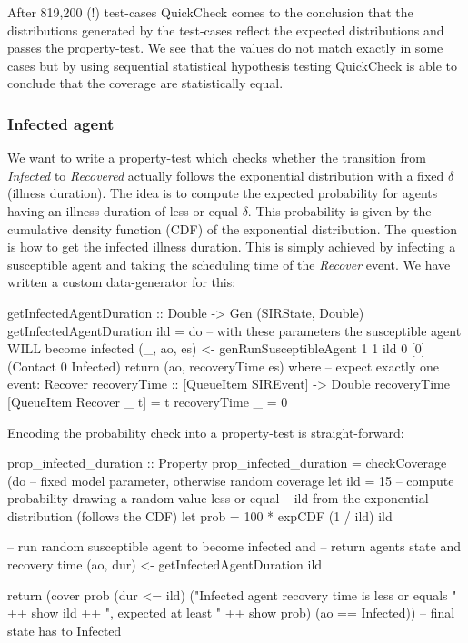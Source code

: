 After 819,200 (!) test-cases QuickCheck comes to the conclusion that the distributions generated by the test-cases reflect the expected distributions and passes the property-test. We see that the values do not match exactly in some cases but by using sequential statistical hypothesis testing QuickCheck is able to conclude that the coverage are statistically equal.

\subsubsection{Infected agent}
We want to write a property-test which checks whether the transition from \textit{Infected} to \textit{Recovered} actually follows the exponential distribution with a fixed $\delta$ (illness duration). The idea is to compute the expected probability for agents having an illness duration of less or equal $\delta$. This probability is given by the cumulative density function (CDF) of the exponential distribution. The question is how to get the infected illness duration. This is simply achieved by infecting a susceptible agent and taking the scheduling time of the \textit{Recover} event. We have written a custom data-generator for this:

\begin{HaskellCode}
getInfectedAgentDuration :: Double -> Gen (SIRState, Double)
getInfectedAgentDuration ild = do
  -- with these parameters the susceptible agent WILL become infected
  (_, ao, es) <- genRunSusceptibleAgent 1 1 ild 0 [0] (Contact 0 Infected)
  return (ao, recoveryTime es)
  where
    -- expect exactly one event: Recover
    recoveryTime :: [QueueItem SIREvent] -> Double
    recoveryTime [QueueItem Recover _ t]  = t
    recoveryTime _ = 0
\end{HaskellCode}

Encoding the probability check into a property-test is straight-forward:

\begin{HaskellCode}
prop_infected_duration :: Property
prop_infected_duration = checkCoverage (do
  -- fixed model parameter, otherwise random coverage
  let ild  = 15
  -- compute probability drawing a random value less or equal
  -- ild from the exponential distribution (follows the CDF)
  let prob = 100 * expCDF (1 / ild) ild

  -- run random susceptible agent to become infected and
  -- return agents state and recovery time
  (ao, dur) <- getInfectedAgentDuration ild

  return (cover prob (dur <= ild) 
            ("Infected agent recovery time is less or equals " ++ show ild ++ 
             ", expected at least " ++ show prob) 
            (ao == Infected)) -- final state has to Infected
\end{HaskellCode}

